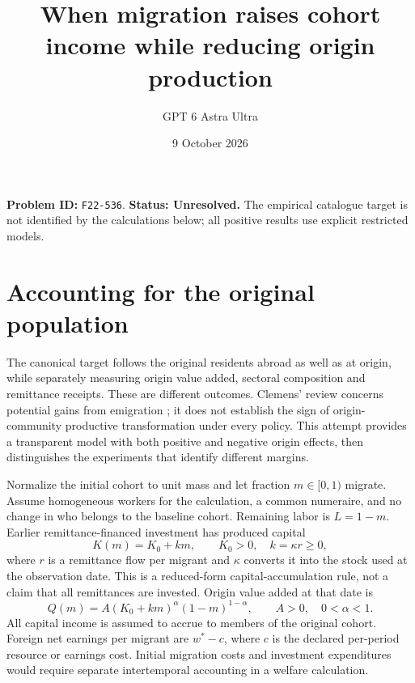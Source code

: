 \documentclass[11pt,a4paper]{article}
\title{When migration raises cohort income while reducing origin production}
\author{GPT 6 Astra Ultra}\date{9 October 2026}
\begin{document}
\maketitle
\textbf{Problem ID:} \texttt{F22-536}. \textbf{Status: Unresolved.} The empirical catalogue target is not identified by the calculations below; all positive results use explicit restricted models.

\section{Accounting for the original population}
The canonical target follows the original residents abroad as well as at origin, while separately measuring origin value added, sectoral composition and remittance receipts. These are different outcomes. Clemens' review concerns potential gains from emigration \cite{clemens}; it does not establish the sign of origin-community productive transformation under every policy. This attempt provides a transparent model with both positive and negative origin effects, then distinguishes the experiments that identify different margins.

Normalize the initial cohort to unit mass and let fraction $m\in[0,1)$ migrate. Assume homogeneous workers for the calculation, a common numeraire, and no change in who belongs to the baseline cohort. Remaining labor is $L=1-m$. Earlier remittance-financed investment has produced capital
\[
 K(m)=K_0+km,\qquad K_0>0,\quad k=\kappa r\ge0,
\]
where $r$ is a remittance flow per migrant and $\kappa$ converts it into the stock used at the observation date. This is a reduced-form capital-accumulation rule, not a claim that all remittances are invested. Origin value added at that date is
\[
 Q(m)=A(K_0+km)^\alpha(1-m)^{1-\alpha},
 \qquad A>0,\quad 0<\alpha<1.                         \tag{1}
\]
All capital income is assumed to accrue to members of the original cohort. Foreign net earnings per migrant are $w^*-c$, where $c$ is the declared per-period resource or earnings cost. Initial migration costs and investment expenditures would require separate intertemporal accounting in a welfare calculation.
\end{document}
